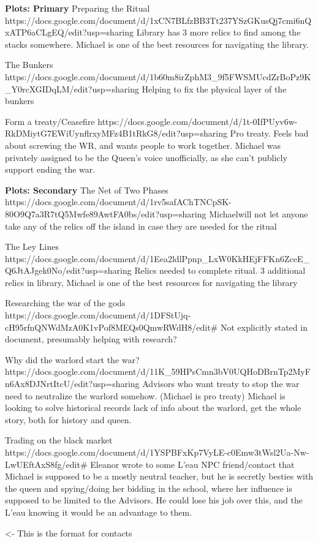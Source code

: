 \documentclass[char]{GL2020}
\begin{document}
\textbf{Plots: Primary}
Preparing the Ritual
https://docs.google.com/document/d/1xCN7BLfzBB3Tt237YSzGKusQj7cmi6nQxATP6aCLgEQ/edit?usp=sharing
Library has 3 more relics to find among the stacks somewhere. Michael is one of the best resources for navigating the library.

The Bunkers
https://docs.google.com/document/d/1b60m8irZphM3_9f5FWSMUcdZrBoPz9K_Y0rcXGIDqLM/edit?usp=sharing
Helping to fix the physical layer of the bunkers

Form a treaty/Ceasefire
https://docs.google.com/document/d/1t-0IfPUyv6w-RkDMiytG7EWiUynflrxyMFz4B1tRkG8/edit?usp=sharing
Pro treaty. Feels bad about screwing the WR, and wants people to work together. Michael was privately assigned to be the Queen’s voice unofficially, as she can’t publicly support ending the war.

\textbf{Plots: Secondary}
The Net of Two Phases
https://docs.google.com/document/d/1rv5safAChTNCpSK-80O9Q7a3R7tQ5Mwfe89AwtFA0bs/edit?usp=sharing
Michaelwill not let anyone take any of the relics off the island in case they are needed for the ritual

The Ley Lines
https://docs.google.com/document/d/1Eea2ldlPpnp_LxW0KkHEjFFKn6ZceE_Q6JtAJgek0No/edit?usp=sharing
Relics needed to complete ritual.  3 additional relics in library, Michael is one of the best resources for navigating the library

Researching the war of the gods
https://docs.google.com/document/d/1DFStUjq-cH95rfnQNWdMzA0K1vPof8MEQs0QmwRWdH8/edit#
Not explicitly stated in document, presumably helping with research?

Why did the warlord start the war?
https://docs.google.com/document/d/11K_59HPsCmn3bV0UQHoDBrnTp2MyFn6Ax8DJNrtItcU/edit?usp=sharing
Advisors who want treaty to stop the war need to neutralize the warlord somehow.  (Michael is pro treaty) Michael is looking to solve historical records lack of info about the warlord, get the whole story, both for history and queen.

Trading on the black market
https://docs.google.com/document/d/1YSPBFxKp7VyLE-c0Emw3tWsl2Ua-Nw-LwUEftAxS8fg/edit#
Eleanor wrote to some L’eau NPC friend/contact that Michael is supposed to be a mostly neutral teacher, but he is secretly besties with the queen and spying/doing her bidding in the school, where her influence is supposed to be limited to the Advisors.  He could lose his job over this, and the L’eau knowing it would be an advantage to them.


\begin{itemz}[Goals]
	\item 
\end{itemz}

\begin{itemz}[Notes]
	\item 
\end{itemz}

\begin{contacts}
	\contact{\cTest{}} <- This is the format for contacts 
\end{contacts}
\end{document}
